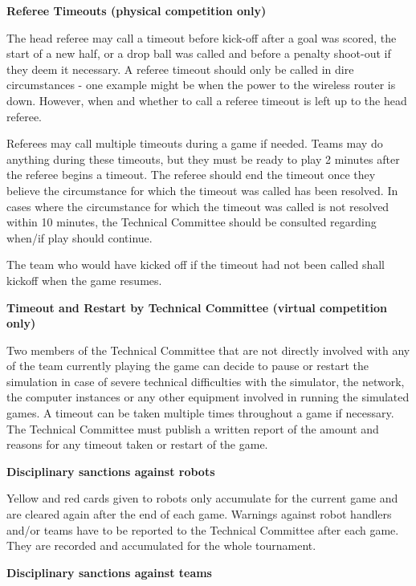 \bigskip

{\bfseries Referee Timeouts (physical competition only)}

The head referee may call a timeout before kick-off after a goal was scored,
the start of a new half, or a drop ball was called and before a penalty
shoot-out if they deem it necessary.
A referee timeout should only be called in dire circumstances -
one example might be when the power to the wireless router is down.
However, when and whether to call a referee timeout is left up to the head referee.

Referees may call multiple timeouts during a game if needed. Teams may do anything during these timeouts, but they must be ready to play 2 minutes after the referee begins a timeout. The referee should end the timeout once they believe the circumstance for which the timeout was called has been resolved. In cases where the circumstance for which the timeout was called is not resolved within 10 minutes, the Technical Committee should be consulted regarding when/if play should continue.

The team who would have kicked off if the timeout had not been called shall kickoff when the game resumes.

\bigskip

{\bfseries Timeout and Restart by Technical Committee (virtual competition only)}

Two members of the Technical Committee that are not directly involved with any of the team currently playing the game can decide to pause or restart the simulation in case of severe technical difficulties with the simulator, the network, the computer instances or any other equipment involved in running the simulated games. A timeout can be taken multiple times throughout a game if necessary. The Technical Committee must publish a written report of the amount and reasons for any timeout taken or restart of the game.

\bigskip

{\bfseries Disciplinary sanctions against robots}

Yellow and red cards given to robots only accumulate for the current game and are cleared again after the end of each game. Warnings against robot handlers and/or teams have to be reported to the Technical Committee after each game. They are recorded and accumulated for the whole tournament.

\bigskip

{\bfseries Disciplinary sanctions against teams }

